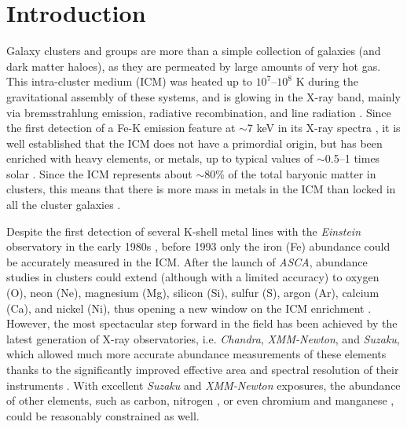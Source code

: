 \documentclass{aa}
\begin{document}
\maketitle





 












\section{Introduction}\label{sect:intro}

Galaxy clusters and groups are more than a simple collection of galaxies (and dark matter haloes), as they are permeated by large amounts of very hot gas. This intra-cluster medium (ICM) was heated up to $10^7$--$10^8$ K during the gravitational assembly of these systems, and is glowing in the X-ray band, mainly via bremsstrahlung emission, radiative recombination, and line radiation \citep[for a review, see][]{2010A&ARv..18..127B}. Since the first detection of a Fe-K emission feature at $\sim$7 keV in its X-ray spectra \citep{1976MNRAS.175P..29M,1977ApJ...211L..63S}, it is well established that the ICM does not have a primordial origin, but has been enriched with heavy elements, or metals, up to typical values of $\sim$0.5--1 times solar \citep[for reviews, see][]{2008SSRv..134..337W,2013AN....334..416D}. Since the ICM represents about $\sim$80\% of the total baryonic matter in clusters, this means that there is more mass in metals in the ICM than locked in all the cluster galaxies \citep[e.g.][]{2014MNRAS.444.3581R}.


Despite the first detection of several K-shell metal lines with the \textit{Einstein} observatory in the early 1980s
\citep[e.g.][]{1979ApJ...234L..33C,1981ApJ...244L..47M}, before 1993 only the iron (Fe) abundance could be accurately measured in the ICM. After the launch of \textit{ASCA}, abundance studies in clusters could extend (although with a limited accuracy) to oxygen (O), neon (Ne), magnesium (Mg), silicon (Si), sulfur (S), argon (Ar), calcium (Ca), and nickel (Ni), thus opening a new window on the ICM enrichment \citep[e.g.][]{1996ApJ...466..686M,2005ApJ...620..680B}. However, the most spectacular step forward in the field has been achieved by the latest generation of X-ray observatories, i.e. \textit{Chandra}, \textit{XMM-Newton}, and \textit{Suzaku}, which allowed much more accurate abundance measurements of these elements thanks to the significantly improved effective area and spectral resolution of their instruments \citep[e.g.][]{2001A&A...379..107T,2006A&A...452..397D,2006A&A...459..353W}. With excellent \textit{Suzaku} and \textit{XMM-Newton} exposures, the abundance of other elements, such as carbon, nitrogen \citep[e.g.][Mao et al. 2017, to be submitted]{2006A&A...459..353W,2011MNRAS.412L..35S}, or even chromium and manganese \citep{2009ApJ...705L..62T,2016A&A...592A.157M}, could be reasonably constrained as well.
\end{document}
